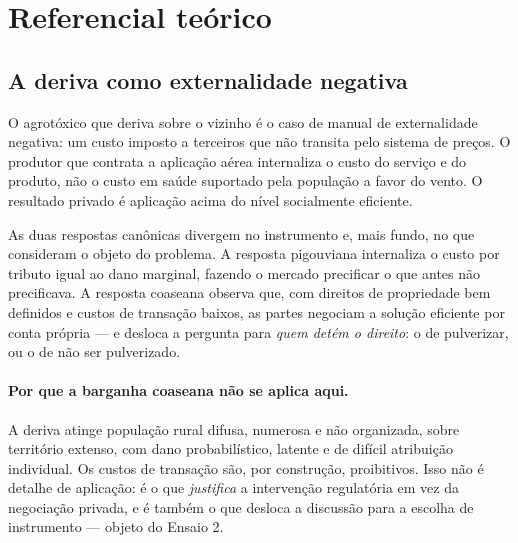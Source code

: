 %
%

\section{Referencial teórico}
\label{sec:teoria}

\subsection{A deriva como externalidade negativa}
\label{sub:externalidade}

O agrotóxico que deriva sobre o vizinho é o caso de manual de externalidade
negativa: um custo imposto a terceiros que não transita pelo sistema de preços. O
produtor que contrata a aplicação aérea internaliza o custo do serviço e do
produto, não o custo em saúde suportado pela população a favor do vento. O
resultado privado é aplicação acima do nível socialmente eficiente.

As duas respostas canônicas divergem no instrumento e, mais fundo, no que
consideram o objeto do problema. A resposta pigouviana internaliza o custo por
tributo igual ao dano marginal, fazendo o mercado precificar o que antes não
precificava. A resposta coaseana observa que, com direitos de propriedade bem
definidos e custos de transação baixos, as partes negociam a solução eficiente
por conta própria \citep{coase1960} --- e desloca a pergunta para \emph{quem
detém o direito}: o de pulverizar, ou o de não ser pulverizado.

\paragraph{Por que a barganha coaseana não se aplica aqui.} A deriva atinge
população rural difusa, numerosa e não organizada, sobre território extenso, com
dano probabilístico, latente e de difícil atribuição individual. Os custos de
transação são, por construção, proibitivos. Isso não é detalhe de aplicação: é o
que \emph{justifica} a intervenção regulatória em vez da negociação privada, e é
também o que desloca a discussão para a escolha de instrumento --- objeto do
Ensaio 2.

